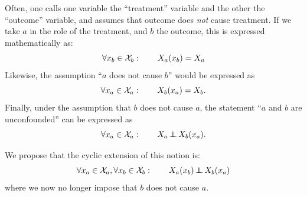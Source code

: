 {%
Often, one calls one variable the ``treatment'' variable and the other the ``outcome'' variable, and assumes that outcome does \emph{not} cause treatment.
If we take $a$ in the role of the treatment, and $b$ the outcome, this is expressed mathematically as:
$$\forall x_b \in \mathcal{X}_b: \qquad X_a(x_b) = X_a$$
Likewise, the assumption ``$a$ does not cause $b$'' would be expressed as
$$\forall x_a \in \mathcal{X}_a: \qquad X_b(x_a) = X_b.$$
Finally, under the assumption that $b$ does not cause $a$, the statement ``$a$ and $b$ are unconfounded'' can be expressed as
$$\forall x_a \in \mathcal{X}_a: \qquad X_a \operatorname*{\perp\mkern-11mu\perp} X_b(x_a).$$

We propose that the cyclic extension of this notion is:
$$\forall x_a \in \mathcal{X}_a, \forall x_b \in \mathcal{X}_b: \qquad X_a(x_b) \operatorname*{\perp\mkern-11mu\perp} X_b(x_a)$$
where we now no longer impose that $b$ does not cause $a$.
}
